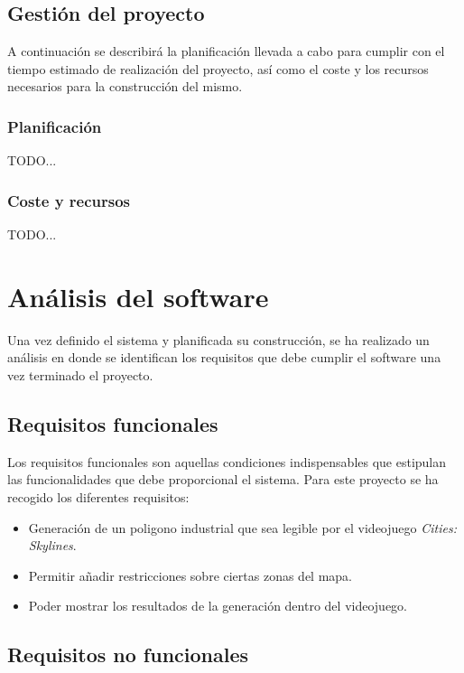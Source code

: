 \subsection{Gestión del proyecto}
\label{subsec:gestion}

A continuación se describirá la planificación llevada a cabo para cumplir con el tiempo estimado de realización del proyecto, así como el coste y los recursos necesarios para la construcción del mismo.

\subsubsection{Planificación}

TODO...

\subsubsection{Coste y recursos}

TODO...

\section{Análisis del software}

Una vez definido el sistema y planificada su construcción, se ha realizado un análisis en donde se identifican los requisitos que debe cumplir el software una vez terminado el proyecto.

\subsection{Requisitos funcionales}
\label{subsec:funcrequirements}

Los requisitos funcionales son aquellas condiciones indispensables que estipulan las funcionalidades que debe proporcional el sistema. Para este proyecto se ha recogido los diferentes requisitos:

\begin{itemize}
	\item Generación de un poligono industrial que sea legible por el videojuego \textit{Cities: Skylines\textcopyright}.
	\item Permitir añadir restricciones sobre ciertas zonas del mapa.
	\item Poder mostrar los resultados de la generación dentro del videojuego.
\end{itemize}

\subsection{Requisitos no funcionales}

